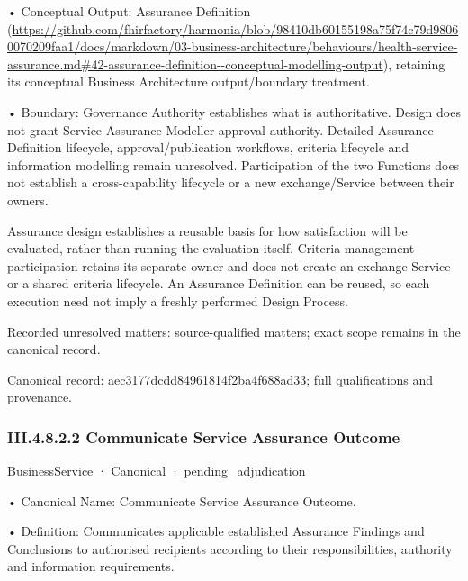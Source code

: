 •
Conceptual Output: Assurance Definition (\url{https://github.com/fhirfactory/harmonia/blob/98410db60155198a75f74c79d98060070209faa1/docs/markdown/03-business-architecture/behaviours/health-service-assurance.md#42-assurance-definition--conceptual-modelling-output}), retaining its conceptual Business Architecture output/boundary treatment.



•
Boundary: Governance Authority establishes what is authoritative. Design does not grant Service Assurance Modeller approval authority. Detailed Assurance Definition lifecycle, approval/publication workflows, criteria lifecycle and information modelling remain unresolved. Participation of the two Functions does not establish a cross-capability lifecycle or a new exchange/Service between their owners.



Assurance design establishes a reusable basis for how satisfaction will be evaluated, rather than running the evaluation itself. Criteria-management participation retains its separate owner and does not create an exchange Service or a shared criteria lifecycle. An Assurance Definition can be reused, so each execution need not imply a freshly performed Design Process.


{\small Recorded unresolved matters: source-qualified matters; exact scope remains in the canonical record.}\par
{\footnotesize \href{../../../../../../../../continuum/business/business-process/aec3177dcdd84961814f2ba4f688ad33.md}{Canonical record: aec3177dcdd84961814f2ba4f688ad33}; full qualifications and provenance.}\par
\subsubsection*{III.4.8.2.2 Communicate Service Assurance Outcome}
\label{navigation:III.4.8.2.2}

\label{element:371b04d6bbf84b53a3c5667ae6df2809}
{\small BusinessService · Canonical · pending\_adjudication}\par

•
Canonical Name: Communicate Service Assurance Outcome.



•
Definition: Communicates applicable established Assurance Findings and Conclusions to authorised recipients according to their responsibilities, authority and information requirements.



